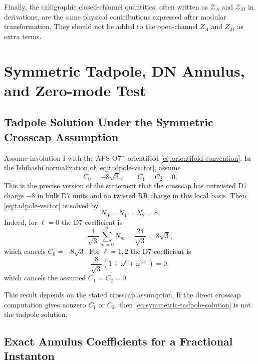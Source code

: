 \documentclass[11pt]{article}
\begin{document}
Finally, the calligraphic closed-channel quantities, often written as $\mathcal Z_A$ and
$\mathcal Z_M$ in derivations, are the same physical contributions expressed after modular
transformation. They should not be added to the open-channel $Z_A$ and $Z_M$ as extra terms.

\section{Symmetric Tadpole, DN Annulus, and Zero-mode Test}

\subsection{Tadpole Solution Under the Symmetric Crosscap Assumption}

Assume involution I with the APS O7$^-$ orientifold \eqref{eq:orientifold-convention}. In
the Ishibashi normalization of \eqref{eq:tadpole-vector}, assume
\begin{equation}
  C_0=-8\sqrt{3},
  \qquad
  C_1=C_2=0.
  \label{eq:symmetric-crosscap-assumption}
\end{equation}
This is the precise version of the statement that the crosscap has untwisted D7 charge $-8$ in
bulk D7 units and no twisted RR charge in this local basis. Then
\eqref{eq:tadpole-vector} is solved by
\begin{equation}
  N_0=N_1=N_2=8.
  \label{eq:symmetric-tadpole-solution}
\end{equation}
Indeed, for $\ell=0$ the D7 coefficient is
\begin{equation}
  \frac{1}{\sqrt{3}}\sum_{m=0}^2 N_m
  =
  \frac{24}{\sqrt{3}}
  =
  8\sqrt{3},
\end{equation}
which cancels $C_0=-8\sqrt{3}$. For $\ell=1,2$ the D7 coefficient is
\begin{equation}
  \frac{8}{\sqrt{3}}\left(1+\omega^\ell+\omega^{2\ell}\right)=0,
\end{equation}
which cancels the assumed $C_1=C_2=0$.

This result depends on the stated crosscap assumption. If the direct crosscap computation gives
nonzero $C_1$ or $C_2$, then \eqref{eq:symmetric-tadpole-solution} is not the tadpole solution.

\subsection{Exact Annulus Coefficients for a Fractional Instanton}
\end{document}
